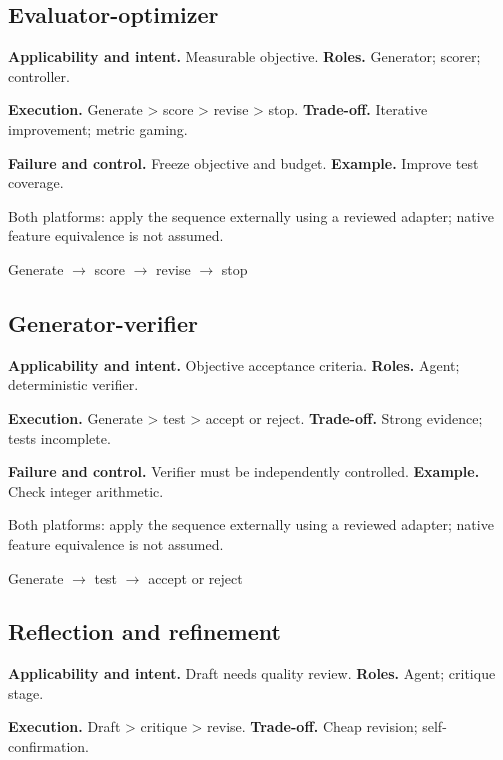 \subsection{Evaluator-optimizer}

\textbf{Applicability and intent.} Measurable objective. \textbf{Roles.} Generator; scorer; controller.

\textbf{Execution.} Generate > score > revise > stop. \textbf{Trade-off.} Iterative improvement; metric gaming.

\textbf{Failure and control.} Freeze objective and budget. \textbf{Example.} Improve test coverage.

Both platforms: apply the sequence externally using a reviewed adapter; native feature equivalence is not assumed.

\begin{center}\small \textsf{Generate} $\rightarrow$ \textsf{score} $\rightarrow$ \textsf{revise} $\rightarrow$ \textsf{stop}\end{center}

\subsection{Generator-verifier}

\textbf{Applicability and intent.} Objective acceptance criteria. \textbf{Roles.} Agent; deterministic verifier.

\textbf{Execution.} Generate > test > accept or reject. \textbf{Trade-off.} Strong evidence; tests incomplete.

\textbf{Failure and control.} Verifier must be independently controlled. \textbf{Example.} Check integer arithmetic.

Both platforms: apply the sequence externally using a reviewed adapter; native feature equivalence is not assumed.

\begin{center}\small \textsf{Generate} $\rightarrow$ \textsf{test} $\rightarrow$ \textsf{accept or reject}\end{center}

\subsection{Reflection and refinement}

\textbf{Applicability and intent.} Draft needs quality review. \textbf{Roles.} Agent; critique stage.

\textbf{Execution.} Draft > critique > revise. \textbf{Trade-off.} Cheap revision; self-confirmation.

